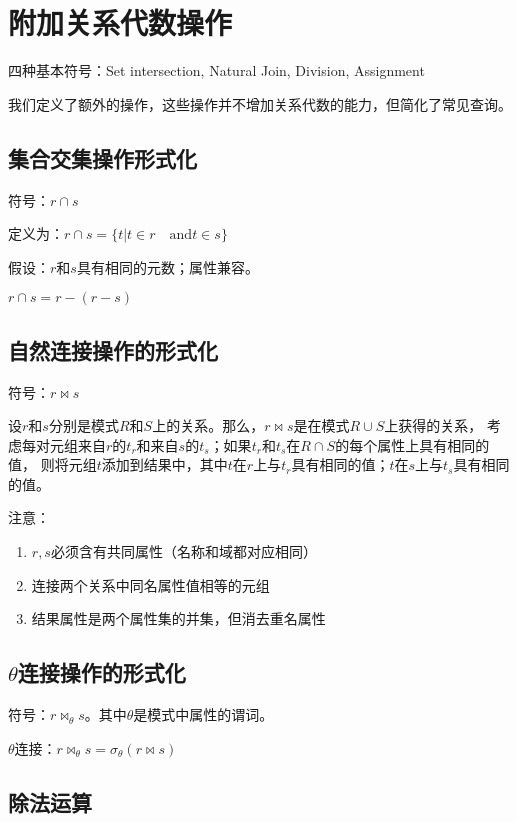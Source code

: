 \section{附加关系代数操作}

四种基本符号：Set intersection, Natural Join, Division, Assignment

我们定义了额外的操作，这些操作并不增加关系代数的能力，但简化了常见查询。

\subsection{集合交集操作形式化}

符号：$r\cap s$

定义为：$r\cap s=\{t|t\in r\quad \text{and} t\in s\}$

假设：$r$和$s$具有相同的元数；属性兼容。

$r\cap s=r-(r-s)$

\subsection{自然连接操作的形式化}

符号：$r\Join s$

设$r$和$s$分别是模式$R$和$S$上的关系。那么，$r\Join s$是在模式$R\cup S$上获得的关系，
考虑每对元组来自$r$的$t_r$和来自$s$的$t_s$；如果$t_r$和$t_s$在$R\cap S$的每个属性上具有相同的值，
则将元组$t$添加到结果中，其中$t$在$r$上与$t_r$具有相同的值；$t$在$s$上与$t_s$具有相同的值。

注意：
\begin{enumerate}
    \item $r,s$必须含有共同属性（名称和域都对应相同）
    \item 连接两个关系中同名属性值相等的元组
    \item 结果属性是两个属性集的并集，但消去重名属性
\end{enumerate}

\subsection{$\theta$连接操作的形式化}

符号：$r\Join_{\theta}s$。其中$\theta$是模式中属性的谓词。

$\theta$连接：$r\Join_{\theta}s=\sigma_{\theta}(r\Join s)$

\subsection{除法运算}

